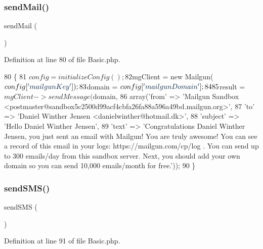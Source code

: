 \subsubsection{\texorpdfstring{send\+Mail()}{sendMail()}}
{\footnotesize\ttfamily send\+Mail (\begin{DoxyParamCaption}{ }\end{DoxyParamCaption})}



Definition at line 80 of file Basic.\+php.


\begin{DoxyCode}
80                                \{
81         $config = initializeConfig();
82         $mgClient = \textcolor{keyword}{new} Mailgun($config[\textcolor{stringliteral}{'mailgunKey'}]);
83         $domain = $config[\textcolor{stringliteral}{'mailgunDomain'}];
84 
85         $result = $mgClient->sendMessage($domain,
86             array(\textcolor{stringliteral}{'from'}    => \textcolor{stringliteral}{'Mailgun Sandbox
       <postmaster@sandbox5c2500d99acf4cbfa26fa88a596a49bd.mailgun.org>'},
87                 \textcolor{stringliteral}{'to'}      => \textcolor{stringliteral}{'Daniel Winther Jensen <danielwinther@hotmail.dk>'},
88                 \textcolor{stringliteral}{'subject'} => \textcolor{stringliteral}{'Hello Daniel Winther Jensen'},
89                 \textcolor{stringliteral}{'text'}    => \textcolor{stringliteral}{'Congratulations Daniel Winther Jensen, you just sent an email with Mailgun! 
       You are truly awesome!  You can see a record of this email in your logs: https://mailgun.com/cp/log .  You
       can send up to 300 emails/day from this sandbox server.  Next, you should add your own domain so you can send
       10,000 emails/month for free.'}));
90     \}
\end{DoxyCode}
\hypertarget{class_basic_a624b6482127c1e3ea78392e7e93db949}{}\label{class_basic_a624b6482127c1e3ea78392e7e93db949} 
\subsubsection{\texorpdfstring{send\+S\+M\+S()}{sendSMS()}}
{\footnotesize\ttfamily send\+S\+MS (\begin{DoxyParamCaption}{ }\end{DoxyParamCaption})}



Definition at line 91 of file Basic.\+php.


